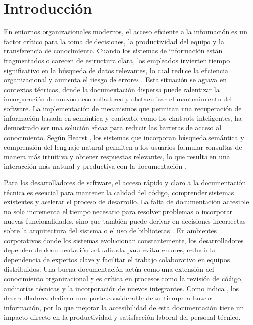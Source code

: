 \chapter{Introducción}

En entornos organizacionales modernos, el acceso eficiente a la información es un factor crítico para la toma de decisiones, la productividad del equipo y la transferencia de conocimiento. Cuando los sistemas de información están fragmentados o carecen de estructura clara, los empleados invierten tiempo significativo en la búsqueda de datos relevantes, lo cual reduce la eficiencia organizacional y aumenta el riesgo de errores \parencite{davenport1997working}. Esta situación se agrava en contextos técnicos, donde la documentación dispersa puede ralentizar la incorporación de nuevos desarrolladores y obstaculizar el mantenimiento del software.
La implementación de mecanismos que permitan una recuperación de información basada en semántica y contexto, como los chatbots inteligentes, ha demostrado ser una solución eficaz para reducir las barreras de acceso al conocimiento. Según Hearst \parencite{hearst2009search}, los sistemas que incorporan búsqueda semántica y comprensión del lenguaje natural permiten a los usuarios formular consultas de manera más intuitiva y obtener respuestas relevantes, lo que resulta en una interacción más natural y productiva con la documentación \parencite{davenport1997working}.

Para los desarrolladores de software, el acceso rápido y claro a la documentación técnica es esencial para mantener la calidad del código, comprender sistemas existentes y acelerar el proceso de desarrollo. La falta de documentación accesible no solo incrementa el tiempo necesario para resolver problemas o incorporar nuevas funcionalidades, sino que también puede derivar en decisiones incorrectas sobre la arquitectura del sistema o el uso de bibliotecas \parencite{spinellis2006code}. En ambientes corporativos donde los sistemas evolucionan constantemente, los desarrolladores dependen de documentación actualizada para evitar errores, reducir la dependencia de expertos clave y facilitar el trabajo colaborativo en equipos distribuidos.
Una buena documentación actúa como una extensión del conocimiento organizacional y es crítica en procesos como la revisión de código, auditorías técnicas y la incorporación de nuevos integrantes. Como indica \parencite{forward2002relevance}, los desarrolladores dedican una parte considerable de su tiempo a buscar información, por lo que mejorar la accesibilidad de esta documentación tiene un impacto directo en la productividad y satisfacción laboral del personal técnico.

